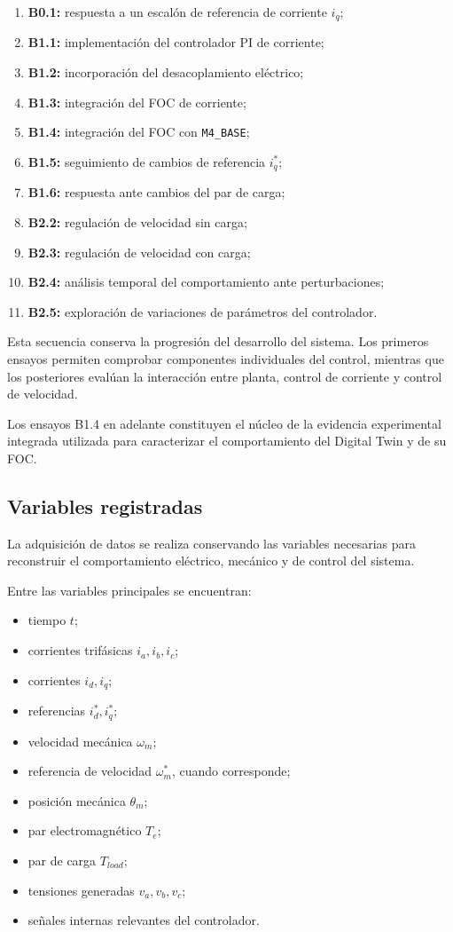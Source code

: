 \begin{enumerate}
\item \textbf{B0.1:} respuesta a un escalón de referencia de corriente \(i_q\);
\item \textbf{B1.1:} implementación del controlador PI de corriente;
\item \textbf{B1.2:} incorporación del desacoplamiento eléctrico;
\item \textbf{B1.3:} integración del FOC de corriente;
\item \textbf{B1.4:} integración del FOC con \texttt{M4\_BASE};
\item \textbf{B1.5:} seguimiento de cambios de referencia \(i_q^*\);
\item \textbf{B1.6:} respuesta ante cambios del par de carga;
\item \textbf{B2.2:} regulación de velocidad sin carga;
\item \textbf{B2.3:} regulación de velocidad con carga;
\item \textbf{B2.4:} análisis temporal del comportamiento ante perturbaciones;
\item \textbf{B2.5:} exploración de variaciones de parámetros del controlador.
\end{enumerate}

Esta secuencia conserva la progresión del desarrollo del sistema. Los primeros ensayos permiten comprobar componentes individuales del control, mientras que los posteriores evalúan la interacción entre planta, control de corriente y control de velocidad.

Los ensayos B1.4 en adelante constituyen el núcleo de la evidencia experimental integrada utilizada para caracterizar el comportamiento del Digital Twin y de su FOC.

\subsection{Variables registradas}

La adquisición de datos se realiza conservando las variables necesarias para reconstruir el comportamiento eléctrico, mecánico y de control del sistema.

Entre las variables principales se encuentran:

\begin{itemize}
\item tiempo \(t\);
\item corrientes trifásicas \(i_a,i_b,i_c\);
\item corrientes \(i_d,i_q\);
\item referencias \(i_d^*,i_q^*\);
\item velocidad mecánica \(\omega_m\);
\item referencia de velocidad \(\omega_m^*\), cuando corresponde;
\item posición mecánica \(\theta_m\);
\item par electromagnético \(T_e\);
\item par de carga \(T_{load}\);
\item tensiones generadas \(v_a,v_b,v_c\);
\item señales internas relevantes del controlador.
\end{itemize}

